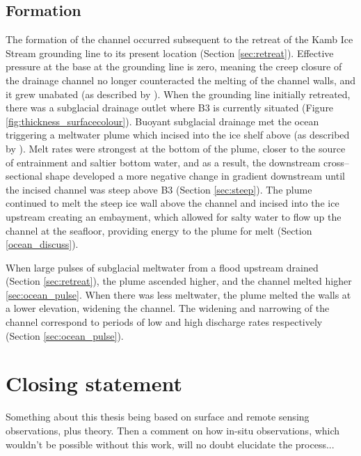 \subsection{Formation}
The formation of the channel occurred subsequent to the retreat of the Kamb Ice Stream grounding line to its present location (Section \ref{sec:retreat}). Effective pressure at the base at the grounding line is zero, meaning the creep closure of the drainage channel no longer counteracted the melting of the channel walls, and it grew unabated (as described by \cite{drews2015evolution}). 
When the grounding line initially retreated, there was a subglacial drainage outlet where B3 is currently situated (Figure \ref{fig:thickness_surfacecolour}). Buoyant subglacial drainage met the ocean triggering a meltwater plume which incised into the ice shelf above (as described by \cite{hewitt2020subglacial}). Melt rates were strongest at the bottom of the plume, closer to the source of entrainment and saltier bottom water, and as a result, the downstream cross--sectional shape developed a more negative change in gradient downstream until the incised channel was steep above B3 (Section \ref{sec:steep}). The plume continued to melt the steep ice wall above the channel and incised into the ice upstream creating an embayment, which allowed for salty water to flow up the channel at the seafloor, providing energy to the plume for melt (Section \ref{ocean_discuss}). 

When large pulses of subglacial meltwater from a flood upstream drained (Section \ref{sec:retreat}), the plume ascended higher, and the channel melted higher \ref{sec:ocean_pulse}. When there was less meltwater, the plume melted the walls at a lower elevation, widening the channel. The widening and narrowing of the channel correspond to periods of low and high discharge rates respectively (Section \ref{sec:ocean_pulse}).

\section{Closing statement}

Something about this thesis being based on surface and remote sensing observations, plus theory.
Then a comment on how in-situ observations, which wouldn't be possible without this work, will no doubt elucidate the process...






